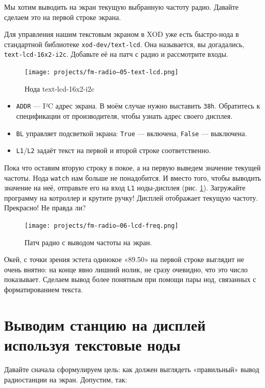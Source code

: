 Мы хотим выводить на экран текущую выбранную частоту радио. Давайте сделаем это на первой строке экрана.

Для управления нашим текстовым экраном в XOD уже есть быстро-нода в стандартной библиотеке \texttt{xod-dev/text-lcd}. Она называется, вы догадались, \texttt{text-lcd-16x2-i2c}. Добавьте её на патч с радио и рассмотрите входы.

\begin{figure}
  \centering
  \texttt{[image: projects/fm-radio--05-text-lcd.png]}
  \caption{Нода text-lcd-16x2-i2c}
\end{figure}

\begin{itemize}
  \item \texttt{ADDR} — I²C адрес экрана. В моём случае нужно выставить \texttt{38h}. Обратитесь к спецификации от производителя, чтобы узнать адрес своего дисплея.
  \item \texttt{BL} управляет подсветкой экрана: \texttt{True} — включена, \texttt{False} — выключена.
  \item \texttt{L1}/\texttt{L2} задаёт текст на первой и второй строке соответственно.
\end{itemize}

Пока что оставим вторую строку в покое, а на первую выведем значение текущей частоты. Нода \texttt{watch} нам больше не понадобится. И вместо того, чтобы выводить значение на неё, отправьте его на вход \texttt{L1} ноды-дисплея (рис. \ref{patch:lcd-freq}). Загружайте программу на котроллер и крутите ручку! Дисплей отображает текущую частоту. Прекрасно! Не правда ли?

\begin{figure}
  \centering
  \texttt{[image: projects/fm-radio--06-lcd-freq.png]}
  \caption{Патч радио с выводом частоты на экран.}
  \label{patch:lcd-freq}
\end{figure}

Окей, с точки зрения эстета одинокое «89.50» на первой строке выглядит не очень внятно: на конце явно лишний нолик, не сразу очевидно, что это число показывает. Сделаем вывод более понятным при помощи пары нод, связанных с форматированием текста.

\section{Выводим станцию на дисплей используя текстовые ноды}

Давайте сначала сформулируем цель: как должен выглядеть «правильный» вывод радиостанции на экран. Допустим, так:

